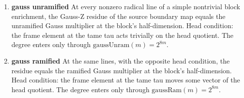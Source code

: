 \begin{enumerate}
\item[(1)] \textbf{gauss unramified} At every nonzero radical line of a simple nontrivial block enrichment, the Gauss-Z residue of the source boundary map equals the unramified Gauss multiplier at the block's half-dimension. Head condition: the frame element at the tame tau acts trivially on the head quotient. The degree enters only through $\mathrm{gaussUnram}(m)=2^{8m}$.
\item[(2)] \textbf{gauss ramified} At the same lines, with the opposite head condition, the residue equals the ramified Gauss multiplier at the block's half-dimension. Head condition: the frame element at the tame tau moves some vector of the head quotient. The degree enters only through $\mathrm{gaussRam}(m)=2^{8m}$.
\end{enumerate}

